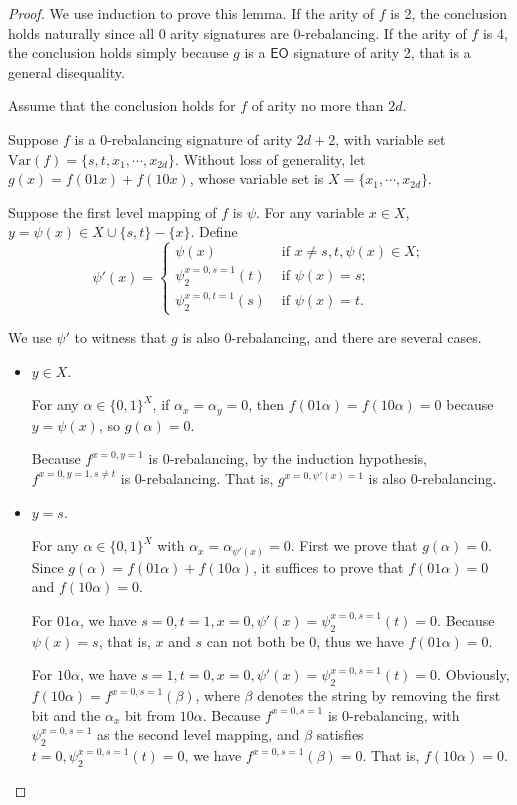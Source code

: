 \documentclass[a4paper,UKenglish,cleveref, autoref, thm-restate]{lipics-v2021}
\newcommand{\eo}[0]{\textsf{EO}}
\newcommand{\ba}[1][0]{{{#1}-rebalancing}}
\begin{document}
\begin{proof}
We use induction to prove this lemma. If the arity of $f$ is 2, the conclusion holds naturally since all 0 arity signatures are \ba[0].
If the arity of $f$ is 4, the conclusion holds simply because $g$ is a $\eo$ signature of arity 2, that is a general disequality. 

Assume that the conclusion holds for $f$ of arity no more than $2d$. 

Suppose $f$ is a \ba[0] signature of arity $2d+2$, with variable set $\text{Var}(f)=\{s,t,x_1, \cdots, x_{2d}\}$.
Without loss of generality, let $g(x)=f(01x)+f(10x)$, whose variable set is $X=\{x_1, \cdots, x_{2d}\}$. 

Suppose the first level mapping of $f$ is $\psi$. For any variable $x \in X$,  $y=\psi(x) \in X \cup \{s,t\} -\{x\}$. Define
\[
\psi'(x)= \left \{ \begin{array}{ll}
    \psi(x) &  \text{ if } x\neq s,t,  \psi(x)\in X; \\
    \psi_2^{x=0,s=1}(t) &    \text{ if }  \psi(x)=s ;\\
    \psi_2^{x=0,t=1}(s) &    \text{ if } \psi(x)=t .
\end{array}  \right.
\]

We use $\psi'$ to witness that $g$ is also \ba[0], and there are several cases. 
  
\begin{itemize}
    \item  $y \in X$. 

For any $\alpha \in \{0,1\}^X$, if $\alpha_x=\alpha_y=0$, then $f(01\alpha)=f(10\alpha)=0$ because $y=\psi(x)$, 
so $g(\alpha)=0$. 

Because $f ^{x=0,y=1}$ is \ba[0], by the induction hypothesis, $f ^{x=0,y=1, s\neq t}$ is \ba[0]. That is, $g^{x=0, \psi'(x)=1}$ is also \ba[0].
    
    \item   $y=s$. 

For any $\alpha \in \{0,1\}^X$ with $\alpha_x=\alpha_{\psi'(x)}=0$. First we prove that $g(\alpha)=0$. Since $g(\alpha)=f(01\alpha)+f(10\alpha)$, it suffices to prove that $f(01\alpha)=0$ and $f(10\alpha)=0$.  

For $01\alpha$, we have $s=0,t=1, x=0, \psi'(x)=\psi_2^{x=0,s=1}(t)=0$. 
Because $\psi(x)=s$, that is, $x$ and $s$ can not both be 0, thus we have $f(01\alpha)=0$. 

For $10\alpha$, we have $s=1,t=0,x=0, \psi'(x)=\psi_2^{x=0,s=1}(t)=0$. 
 Obviously, $f(10\alpha)=f^{x=0,s=1}(\beta)$, where $\beta$ denotes the string by removing the first bit and the $\alpha_x$ bit from $10\alpha$. Because $f^{x=0,s=1}$ is \ba[0], with $\psi_2^{x=0,s=1}$ as the second level mapping, and $\beta$ satisfies $t=0, \psi_2^{x=0,s=1}(t)=0$, we have $f^{x=0,s=1} (\beta)=0$. That is, $f(10\alpha)=0$. 


\end{itemize}
\end{proof}
\end{document}
